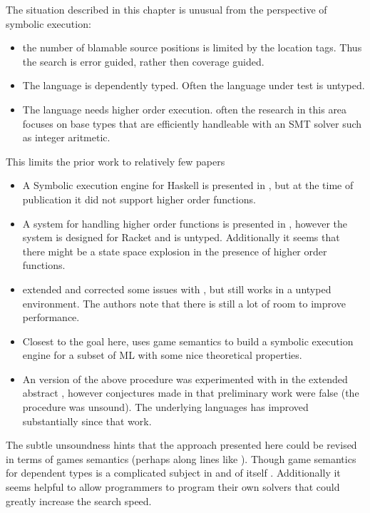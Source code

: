 The situation described in this chapter is unusual from the perspective
of symbolic execution:
\begin{itemize}
\item the number of blamable source positions is limited by the location
tags. Thus the search is error guided, rather then coverage guided.
\item The language is dependently typed. Often the language under test is
untyped.
\item The language needs higher order execution. often the research in this
area focuses on base types that are efficiently handleable with an
SMT solver such as integer aritmetic.
\end{itemize}
This limits the prior work to relatively few papers
\begin{itemize}
\item A Symbolic execution engine for Haskell is presented in \cite{10.1145/3314221.3314618},
but at the time of publication it did not support higher order functions.
\item A system for handling higher order functions is presented in \cite{nguyen2017higher},
however the system is designed for Racket and is untyped. Additionally
it seems that there might be a state space explosion in the presence
of higher order functions.
\item \cite{10.1007/978-3-030-72019-3_23} extended and corrected some issues
with \cite{nguyen2017higher}, but still works in a untyped environment.
The authors note that there is still a lot of room to improve performance.
\item Closest to the goal here, \cite{lin_et_al:LIPIcs:2020:12349} uses
game semantics to build a symbolic execution engine for a subset of
ML with some nice theoretical properties.
\item An version of the above procedure was experimented with in the extended
abstract , however conjectures made in that preliminary
work were false (the procedure was unsound). The underlying languages
has improved substantially since that work.
\end{itemize}
The subtle unsoundness hints that the approach presented here could
be revised in terms of games semantics (perhaps along lines like \cite{lin_et_al:LIPIcs:2020:12349}).
Though game semantics for dependent types is a complicated subject
in and of itself . Additionally it seems helpful to allow
programmers to program their own solvers that could greatly increase
the search speed.

